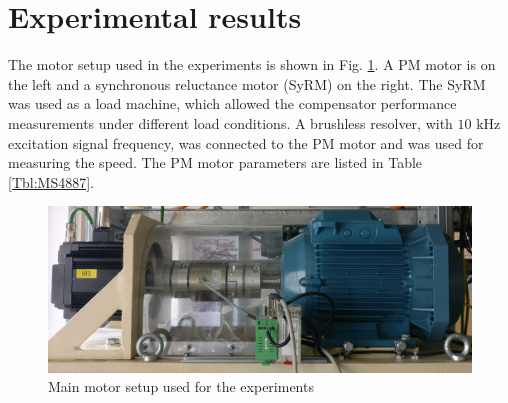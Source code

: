 \section{Experimental results}

The motor setup used in the experiments is shown in Fig. \ref{Fig:M3-setup}. A PM motor is on the left and a synchronous reluctance motor (SyRM) on the right. The SyRM was used as a load machine, which allowed the compensator performance measurements under different load conditions. A brushless resolver, with $10$ kHz excitation signal frequency, was connected to the PM motor and was used for measuring the speed. The PM motor parameters are listed in Table \ref{Tbl:MS4887}.


\begin{figure}[htb] 
    \centering
    \includegraphics[width=1.0\textwidth]{images/M3-setup.jpg}
    \caption{Main motor setup used for the experiments}
    \label{Fig:M3-setup} 
\end{figure}


